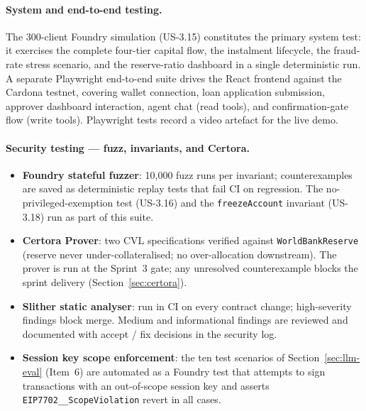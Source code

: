 \paragraph{System and end-to-end testing.}
The 300-client Foundry simulation (US-3.15) constitutes the primary system
test: it exercises the complete four-tier capital flow, the instalment
lifecycle, the fraud-rate stress scenario, and the reserve-ratio
dashboard in a single deterministic run. A separate Playwright
end-to-end suite drives the React frontend against the Cardona testnet,
covering wallet connection, loan application submission, approver
dashboard interaction, agent chat (read tools), and confirmation-gate
flow (write tools). Playwright tests record a video artefact for the
live demo.

\paragraph{Security testing --- fuzz, invariants, and Certora.}
\begin{itemize}[noitemsep]
\item \textbf{Foundry stateful fuzzer}: 10{,}000 fuzz runs per invariant;
counterexamples are saved as deterministic replay tests that fail CI on
regression. The no-privileged-exemption test (US-3.16) and the
\texttt{freezeAccount} invariant (US-3.18) run as part of this suite.
\item \textbf{Certora Prover}: two CVL specifications verified against
\texttt{WorldBankReserve} (reserve never under-collateralised; no
over-allocation downstream). The prover is run at the Sprint~3 gate; any
unresolved counterexample blocks the sprint delivery
(Section~\ref{sec:certora}).
\item \textbf{Slither static analyser}: run in CI on every contract change;
high-severity findings block merge. Medium and informational findings are
reviewed and documented with accept / fix decisions in the security log.
\item \textbf{Session key scope enforcement}: the ten test scenarios of
Section~\ref{sec:llm-eval} (Item~6) are automated as a Foundry test that
attempts to sign transactions with an out-of-scope session key and asserts
\texttt{EIP7702\_\_ScopeViolation} revert in all cases.
\end{itemize}

